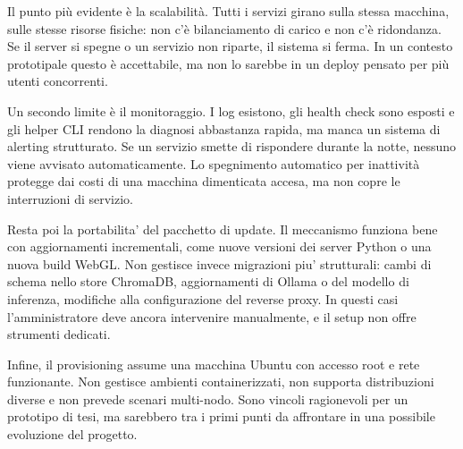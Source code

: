 Il punto più evidente è la scalabilità. Tutti i servizi girano sulla stessa macchina, sulle stesse risorse fisiche: non c'è bilanciamento di carico e non c'è ridondanza. Se il server si spegne o un servizio non riparte, il sistema si ferma. In un contesto prototipale questo è accettabile, ma non lo sarebbe in un deploy pensato per più utenti concorrenti.

Un secondo limite è il monitoraggio. I log esistono, gli health check sono esposti e gli helper CLI rendono la diagnosi abbastanza rapida, ma manca un sistema di alerting strutturato. Se un servizio smette di rispondere durante la notte, nessuno viene avvisato automaticamente. Lo spegnimento automatico per inattività protegge dai costi di una macchina dimenticata accesa, ma non copre le interruzioni di servizio.

Resta poi la portabilita' del pacchetto di update. Il meccanismo funziona bene con aggiornamenti incrementali, come nuove versioni dei server Python o una nuova build WebGL. Non gestisce invece migrazioni piu' strutturali: cambi di schema nello store ChromaDB, aggiornamenti di Ollama o del modello di inferenza, modifiche alla configurazione del reverse proxy. In questi casi l'amministratore deve ancora intervenire manualmente, e il setup non offre strumenti dedicati.

Infine, il provisioning assume una macchina Ubuntu con accesso root e rete funzionante. Non gestisce ambienti containerizzati, non supporta distribuzioni diverse e non prevede scenari multi-nodo. Sono vincoli ragionevoli per un prototipo di tesi, ma sarebbero tra i primi punti da affrontare in una possibile evoluzione del progetto.
